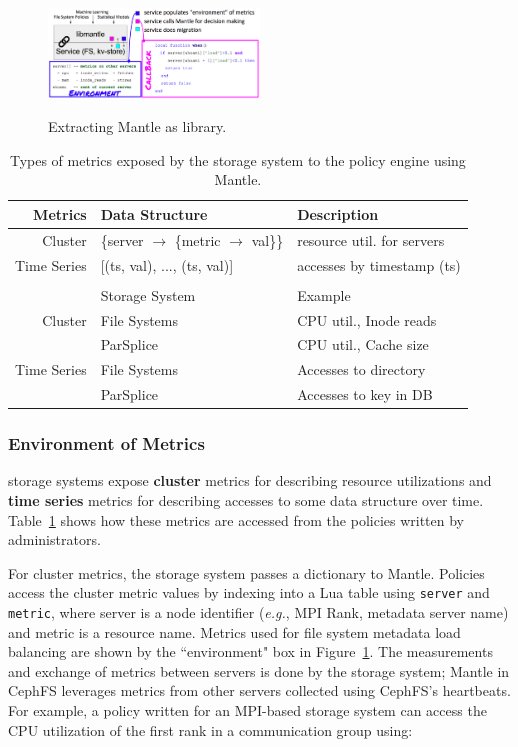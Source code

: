 \begin{figure}[t]
  \noindent\includegraphics[width=0.5\textwidth]{./chapters/controlplane/parsplice/figures/mantle.png}\\

  \caption{Extracting Mantle as library.\label{fig:mantle}}

\end{figure}

\begin{table}
  \centering
  \begin{tabular}{ r | l | l }
  Metrics     & Data Structure & Description \\\hline
  Cluster     & \{server \(\rightarrow\) \{metric \(\rightarrow\) val\}\}
              & resource util. for servers \\
  Time Series & [(ts, val), ..., (ts, val)]
              & accesses by timestamp (ts) \\
  && \\
              & Storage System & Example \\\hline
  Cluster     & File Systems & CPU util., Inode reads \\
              & ParSplice    & CPU util., Cache size \\
  Time Series & File Systems & Accesses to directory \\
              & ParSplice    & Accesses to key in DB\\
  \end{tabular}
  \caption{Types of metrics exposed by the storage system to the policy engine using Mantle.\label{table:metrics}}
\end{table}

\subsubsection{Environment of Metrics} storage systems expose \textbf{cluster} metrics
for describing resource utilizations and \textbf{time series} metrics for
describing accesses to some data structure over time. Table~\ref{table:metrics}
shows how these metrics are accessed from the policies written by
administrators. 

For cluster metrics, the storage system passes a dictionary to Mantle. Policies access
the cluster metric values by indexing into a Lua table using \texttt{server}
and \texttt{metric}, where server is a node identifier ({\it e.g.}, MPI Rank,
metadata server name) and metric is a resource name.  Metrics used for file
system metadata load balancing are shown by the ``environment" box in
Figure~\ref{fig:mantle}. The measurements and exchange of metrics between
servers is done by the storage system; Mantle in CephFS leverages metrics from other
servers collected using CephFS's heartbeats.  For example, a policy written for
an MPI-based storage system can access the CPU utilization of the first rank in a
communication group using:

